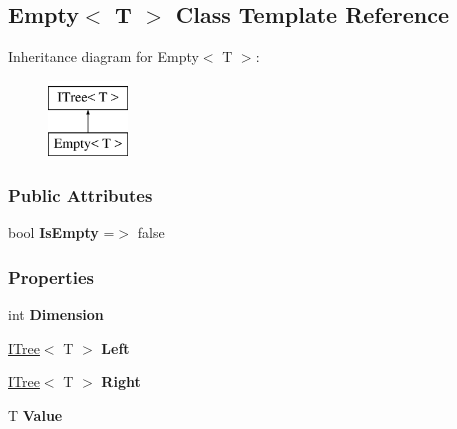 \hypertarget{classTree_1_1Empty}{}\subsection{Empty$<$ T $>$ Class Template Reference}
\label{classTree_1_1Empty}
Inheritance diagram for Empty$<$ T $>$\+:\begin{figure}[H]
\begin{center}
\leavevmode
\includegraphics[height=2.000000cm]{classTree_1_1Empty}
\end{center}
\end{figure}
\subsubsection*{Public Attributes}
\begin{DoxyCompactItemize}
\item 
\mbox{\label{classTree_1_1Empty_aaaa6c7dd3bd14dc2ce7f0780de528bb1}} 
bool {\bfseries Is\+Empty} =$>$ false
\end{DoxyCompactItemize}
\subsubsection*{Properties}
\begin{DoxyCompactItemize}
\item 
\mbox{\label{classTree_1_1Empty_a9fa96587382d530a02e7e15b047e82ee}} 
int {\bfseries Dimension}
\item 
\mbox{\label{classTree_1_1Empty_ab08dc0c825bf3d24d4a6f9d238faaefb}} 
\hyperlink{interfaceTree_1_1ITree}{I\+Tree}$<$ T $>$ {\bfseries Left}
\item 
\mbox{\label{classTree_1_1Empty_ad438dde947eb8d4fa0b73ebb3d7973e9}} 
\hyperlink{interfaceTree_1_1ITree}{I\+Tree}$<$ T $>$ {\bfseries Right}
\item 
\mbox{\label{classTree_1_1Empty_adbfa996292c448f754363aa83d4be8e6}} 
T {\bfseries Value}
\end{DoxyCompactItemize}
